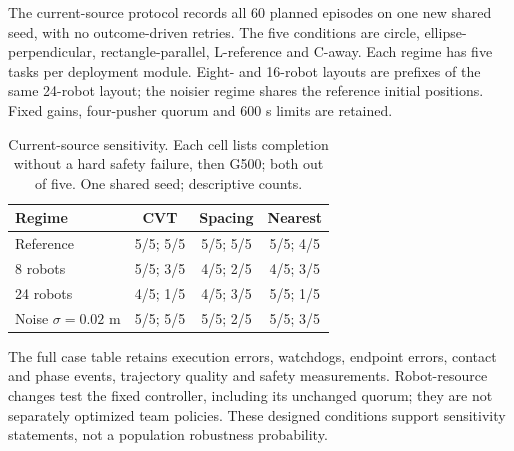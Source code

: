 The current-source protocol records all 60 planned episodes on one new shared seed, with no outcome-driven retries. The five conditions are circle, ellipse-perpendicular, rectangle-parallel, L-reference and C-away. Each regime has five tasks per deployment module. Eight- and 16-robot layouts are prefixes of the same 24-robot layout; the noisier regime shares the reference initial positions. Fixed gains, four-pusher quorum and 600 s limits are retained.
\begin{table}[t]
\centering\caption{Current-source sensitivity. Each cell lists completion without a hard safety failure, then G500; both out of five. One shared seed; descriptive counts.}\label{tab:sensitivity}
\begin{tabular}{lccc}\toprule
Regime & CVT & Spacing & Nearest\\\midrule
Reference & 5/5; 5/5 & 5/5; 5/5 & 5/5; 4/5\\
8 robots & 5/5; 3/5 & 4/5; 2/5 & 4/5; 3/5\\
24 robots & 4/5; 1/5 & 4/5; 3/5 & 5/5; 1/5\\
Noise $\sigma=0.02$ m & 5/5; 5/5 & 5/5; 2/5 & 5/5; 3/5\\
\bottomrule\end{tabular}\end{table}
The full case table retains execution errors, watchdogs, endpoint errors, contact and phase events, trajectory quality and safety measurements. Robot-resource changes test the fixed controller, including its unchanged quorum; they are not separately optimized team policies. These designed conditions support sensitivity statements, not a population robustness probability.
